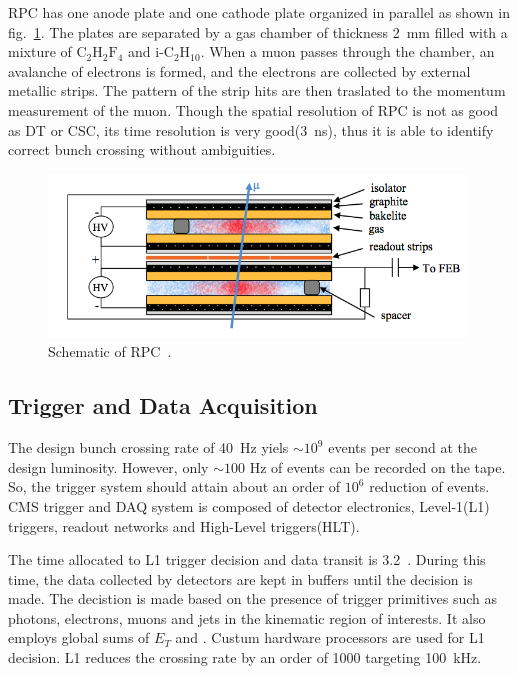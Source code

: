 RPC has one anode plate and one cathode plate organized in parallel
as shown in fig.~\ref{fig:muon_rpc}. 
The plates are separated by a gas chamber of thickness 2~mm 
filled with a mixture of $\textrm{C}_2\textrm{H}_2\textrm{F}_4$ 
and $\textrm{i-C}_2 \textrm{H}_{10}$.
When a muon passes through the chamber, an avalanche of electrons is formed, 
and the electrons are collected by external metallic strips. 
The pattern of the strip hits are then traslated to the momentum measurement
of the muon. Though the spatial resolution of RPC is not as good as DT or CSC,
its time resolution is very good(3~ns), thus it is able to identify 
correct bunch crossing without ambiguities. 
%
\begin{figure}[h] 
\centering
\vspace{1cm}
\includegraphics[width=0.99\textwidth]{figures/rpc.png}
\caption{Schematic of RPC~\cite{Lenzi:2013xpa}.}
\label{fig:muon_rpc} 
\end{figure} 


\subsection{Trigger and Data Acquisition} 

The design bunch crossing rate of 40~Hz yiels $\sim 10^9$ events per second
at the design luminosity. However, only $\sim 100$ Hz of events can be recorded 
on the tape. So, the trigger system should attain about an order of $10^6$ 
reduction of events. CMS trigger and DAQ system is composed of 
detector electronics, Level-1(L1) triggers, readout networks and 
High-Level triggers(HLT). 

The time allocated to L1 trigger decision and data transit is 3.2~\um.
During this time, the data collected by detectors are kept in buffers 
until the decision is made. The decistion is made based on the presence 
of trigger primitives such as photons, electrons, muons and jets 
in the kinematic region of interests. It also employs global sums 
of $E_T$ and \met. Custum hardware processors are used for L1 decision.  
L1 reduces the crossing rate by an order of 1000 targeting 100~kHz.  

